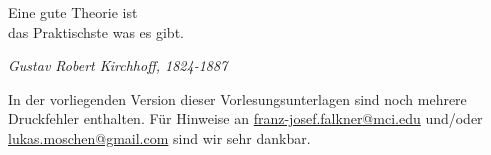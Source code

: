 
 
  \setlength{\epigraphwidth}{0.40\textwidth}
 \epigraph{\large{Eine gute Theorie ist \\ das Praktischste was es gibt.}}{\textit{Gustav Robert Kirchhoff, 1824-1887}}

\vfill
\noindent
In der vorliegenden Version dieser Vorlesungsunterlagen sind noch mehrere Druckfehler enthalten. Für Hinweise an \href{mailto:franz-josef.falkner@mci.edu}{franz-josef.falkner@mci.edu} und/oder \href{mailto:lukas.moschen@gmail.com}{lukas.moschen@gmail.com} sind wir sehr dankbar.
\newpage

